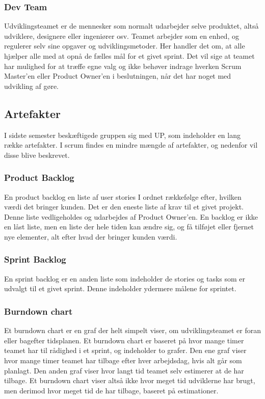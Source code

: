 \subsubsection{Dev Team}
Udviklingsteamet er de mennesker som normalt udarbejder selve produktet, altså udviklere, designere 
eller ingeniører osv. Teamet arbejder som en enhed, og regulerer selv sine opgaver og udviklingsmetoder. 
Her handler det om, at alle hjælper alle med at opnå de fælles mål for et givet sprint. Det vil sige 
at teamet har mulighed for at træffe egne valg og ikke behøver indrage hverken Scrum Master’en eller 
Product Owner’en i beslutningen, når det har noget med udvikling af gøre.

\subsection{Artefakter}
I sidste semester beskæftigede gruppen sig med UP, som indeholder en lang række artefakter. I scrum findes en mindre mængde af 
artefakter, og nedenfor vil disse blive beskrevet.

\subsubsection{Product Backlog}
En product backlog en liste af user stories I ordnet rækkefølge efter, hvilken værdi det bringer kunden. 
Det er den eneste liste af krav til et givet projekt. Denne liste vedligeholdes og udarbejdes af 
Product Owner’en. En backlog er ikke en låst liste, men en liste der hele tiden kan ændre sig, og få 
tilføjet eller fjernet nye elementer, alt efter hvad der bringer kunden værdi. 

\subsubsection{Sprint Backlog}
En sprint backlog er en anden liste som indeholder de stories og tasks som er udvalgt til et givet sprint. Denne indeholder ydermere målene for sprintet. 

\subsubsection{Burndown chart}
Et burndown chart er en graf der helt simpelt viser, om udviklingsteamet er foran eller bagefter tidsplanen. Et burndown chart er baseret på hvor mange timer 
teamet har til rådighed i et sprint, og indeholder to grafer. Den ene graf viser hvor mange timer teamet har tilbage efter hver arbejdsdag, hvis alt går som planlagt.
Den anden graf viser hvor langt tid teamet selv estimerer at de har tilbage. Et burndown chart viser altså ikke hvor meget tid udviklerne har brugt, men derimod hvor meget
tid de har tilbage, baseret på estimationer.

